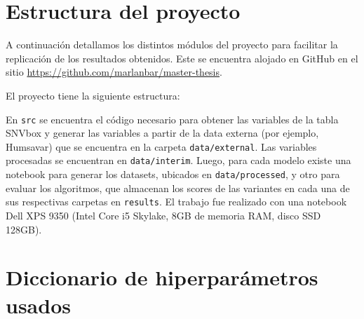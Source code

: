 \section{Estructura del proyecto}

A continuación detallamos los distintos módulos del proyecto para facilitar la replicación de los resultados obtenidos. Este se encuentra alojado en GitHub en el sitio \url{https://github.com/marlanbar/master-thesis}. 

El proyecto tiene la siguiente estructura:

\vspace{0.2cm}
\vspace{0.2cm}

En \texttt{src} se encuentra el código necesario para obtener las variables de la tabla SNVbox y generar las variables a partir de la data externa (por ejemplo, Humsavar) que se encuentra en la carpeta \texttt{data/external}. Las variables procesadas se encuentran en \texttt{data/interim}. Luego, para cada modelo existe una notebook para generar los datasets, ubicados en \texttt{data/processed}, y otro para evaluar los algoritmos, que almacenan los scores de las variantes en cada una de sus respectivas carpetas en \texttt{results}. El trabajo fue realizado con una notebook Dell XPS 9350 (Intel Core i5 Skylake, 8GB de memoria RAM, disco SSD 128GB). 


\section{Diccionario de hiperparámetros usados}

